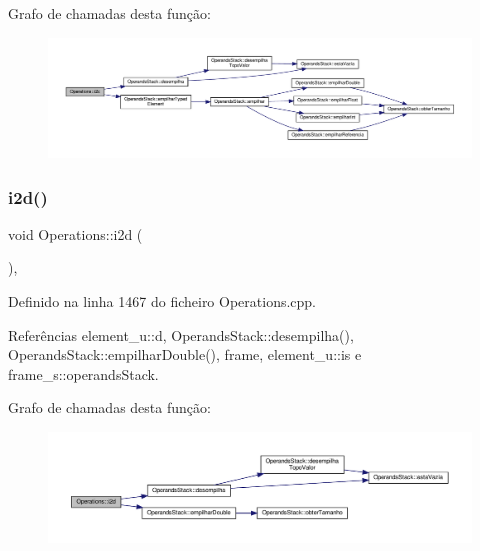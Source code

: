 Grafo de chamadas desta função\+:
\nopagebreak
\begin{figure}[H]
\begin{center}
\leavevmode
\includegraphics[width=350pt]{classOperations_a43b01132bf9acf598d0ced8719c194c7_cgraph}
\end{center}
\end{figure}
\mbox{\label{classOperations_aee9ee24acc934bcf51340dc54d6ed231}} 
\subsubsection{\texorpdfstring{i2d()}{i2d()}}
{\footnotesize\ttfamily void Operations\+::i2d (\begin{DoxyParamCaption}{ }\end{DoxyParamCaption})\hspace{0.3cm}{\ttfamily [static]}, {\ttfamily [private]}}



Definido na linha 1467 do ficheiro Operations.\+cpp.



Referências element\+\_\+u\+::d, Operands\+Stack\+::desempilha(), Operands\+Stack\+::empilhar\+Double(), frame, element\+\_\+u\+::is e frame\+\_\+s\+::operands\+Stack.

Grafo de chamadas desta função\+:
\nopagebreak
\begin{figure}[H]
\begin{center}
\leavevmode
\includegraphics[width=350pt]{classOperations_aee9ee24acc934bcf51340dc54d6ed231_cgraph}
\end{center}
\end{figure}
\mbox{\label{classOperations_a4880878630a620c325840fc7980dc131}} 
